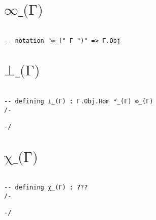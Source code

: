 \section{$\texttt{∞\_(Γ)}$}


\begin{center}
\begin{tcolorbox}[width=5in,colback={white},title={\begin{center}\texttt{Lean \thelcounter} \addtocounter{lcounter}{1}  \end{center}},colbacktitle=Blue,coltitle=black]
\begin{verbatim}

-- notation "∞_(" Γ ")" => Γ.Obj

\end{verbatim}
\end{tcolorbox}
\end{center}

\section{$\texttt{⊥\_(Γ)}$}

\begin{center}
\begin{tcolorbox}[width=5in,colback={white},title={\begin{center}\texttt{Lean \thelcounter} \addtocounter{lcounter}{1}  \end{center}},colbacktitle=Blue,coltitle=black]
\begin{verbatim}

-- defining ⊥_(Γ) : Γ.Obj.Hom *_(Γ) ∞_(Γ)
/-

-/

\end{verbatim}
\end{tcolorbox}
\end{center}

\section{$\texttt{χ\_(Γ)}$}

\begin{center}
\begin{tcolorbox}[width=5in,colback={white},title={\begin{center}\texttt{Lean \thelcounter} \addtocounter{lcounter}{1}  \end{center}},colbacktitle=Blue,coltitle=black]
\begin{verbatim}

-- defining χ_(Γ) : ???
/-

-/

\end{verbatim}
\end{tcolorbox}
\end{center}